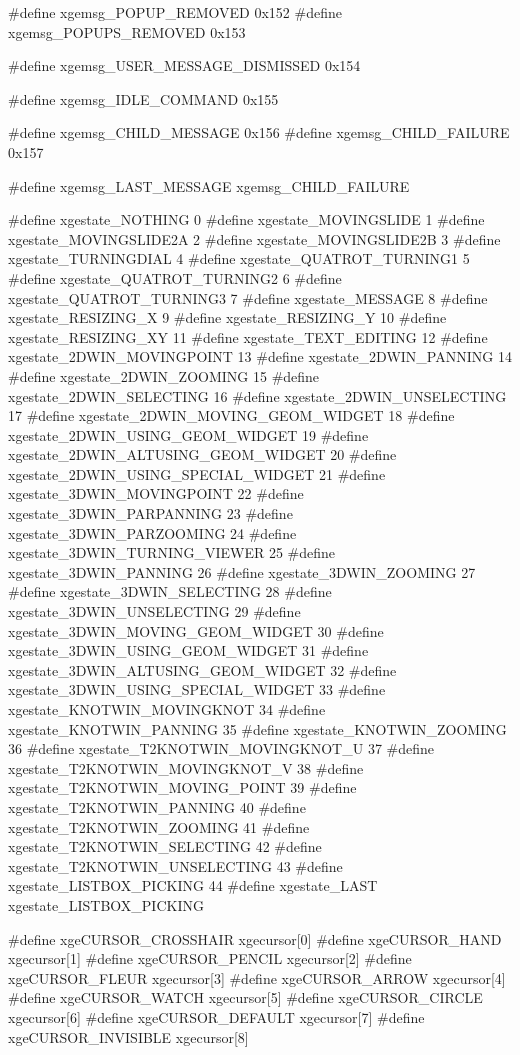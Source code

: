 \begin{listingC}
#define xgemsg_POPUP_REMOVED                 0x152
#define xgemsg_POPUPS_REMOVED                0x153

#define xgemsg_USER_MESSAGE_DISMISSED        0x154

#define xgemsg_IDLE_COMMAND                  0x155

#define xgemsg_CHILD_MESSAGE                 0x156
#define xgemsg_CHILD_FAILURE                 0x157

#define xgemsg_LAST_MESSAGE xgemsg_CHILD_FAILURE

#define xgestate_NOTHING                      0
#define xgestate_MOVINGSLIDE                  1
#define xgestate_MOVINGSLIDE2A                2
#define xgestate_MOVINGSLIDE2B                3
#define xgestate_TURNINGDIAL                  4
#define xgestate_QUATROT_TURNING1             5
#define xgestate_QUATROT_TURNING2             6
#define xgestate_QUATROT_TURNING3             7
#define xgestate_MESSAGE                      8
#define xgestate_RESIZING_X                   9
#define xgestate_RESIZING_Y                  10
#define xgestate_RESIZING_XY                 11
#define xgestate_TEXT_EDITING                12
#define xgestate_2DWIN_MOVINGPOINT           13
#define xgestate_2DWIN_PANNING               14
#define xgestate_2DWIN_ZOOMING               15
#define xgestate_2DWIN_SELECTING             16
#define xgestate_2DWIN_UNSELECTING           17
#define xgestate_2DWIN_MOVING_GEOM_WIDGET    18
#define xgestate_2DWIN_USING_GEOM_WIDGET     19
#define xgestate_2DWIN_ALTUSING_GEOM_WIDGET  20
#define xgestate_2DWIN_USING_SPECIAL_WIDGET  21
#define xgestate_3DWIN_MOVINGPOINT           22
#define xgestate_3DWIN_PARPANNING            23
#define xgestate_3DWIN_PARZOOMING            24
#define xgestate_3DWIN_TURNING_VIEWER        25
#define xgestate_3DWIN_PANNING               26
#define xgestate_3DWIN_ZOOMING               27
#define xgestate_3DWIN_SELECTING             28
#define xgestate_3DWIN_UNSELECTING           29
#define xgestate_3DWIN_MOVING_GEOM_WIDGET    30
#define xgestate_3DWIN_USING_GEOM_WIDGET     31
#define xgestate_3DWIN_ALTUSING_GEOM_WIDGET  32
#define xgestate_3DWIN_USING_SPECIAL_WIDGET  33
#define xgestate_KNOTWIN_MOVINGKNOT          34
#define xgestate_KNOTWIN_PANNING             35
#define xgestate_KNOTWIN_ZOOMING             36
#define xgestate_T2KNOTWIN_MOVINGKNOT_U      37
#define xgestate_T2KNOTWIN_MOVINGKNOT_V      38
#define xgestate_T2KNOTWIN_MOVING_POINT      39
#define xgestate_T2KNOTWIN_PANNING           40
#define xgestate_T2KNOTWIN_ZOOMING           41
#define xgestate_T2KNOTWIN_SELECTING         42
#define xgestate_T2KNOTWIN_UNSELECTING       43
#define xgestate_LISTBOX_PICKING             44
#define xgestate_LAST xgestate_LISTBOX_PICKING

#define xgeCURSOR_CROSSHAIR xgecursor[0]
#define xgeCURSOR_HAND      xgecursor[1]
#define xgeCURSOR_PENCIL    xgecursor[2]
#define xgeCURSOR_FLEUR     xgecursor[3]
#define xgeCURSOR_ARROW     xgecursor[4]
#define xgeCURSOR_WATCH     xgecursor[5]
#define xgeCURSOR_CIRCLE    xgecursor[6]
#define xgeCURSOR_DEFAULT   xgecursor[7]
#define xgeCURSOR_INVISIBLE xgecursor[8]
\end{listingC}

